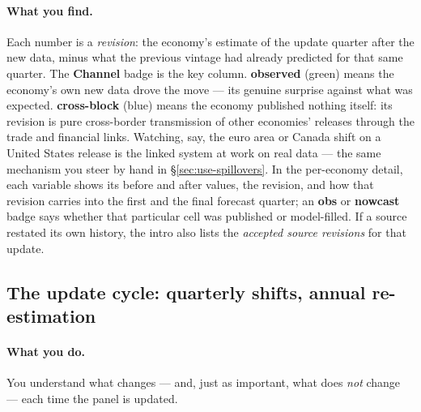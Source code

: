 \documentclass[11pt]{article}
\theoremstyle{definition}
\theoremstyle{remark}
\begin{document}
\paragraph{What you find.}
Each number is a \emph{revision}: the economy's estimate of the update quarter
after the new data, minus what the previous vintage had already predicted for that
same quarter. The \textbf{Channel} badge is the key column. \textbf{observed}
(green) means the economy's own new data drove the move --- its genuine surprise
against what was expected. \textbf{cross-block} (blue) means the economy published
nothing itself: its revision is pure cross-border transmission of other economies'
releases through the trade and financial links. Watching, say, the euro area or
Canada shift on a United States release is the linked system at work on real data
--- the same mechanism you steer by hand in \S\ref{sec:use-spillovers}. In the
per-economy detail, each variable shows its before and after values, the revision,
and how that revision carries into the first and the final forecast quarter; an
\textbf{obs} or \textbf{nowcast} badge says whether that particular cell was
published or model-filled. If a source restated its own history, the intro also
lists the \emph{accepted source revisions} for that update.

\subsection{The update cycle: quarterly shifts, annual re-estimation}

\paragraph{What you do.}
You understand what changes --- and, just as important, what does \emph{not}
change --- each time the panel is updated.
\end{document}
